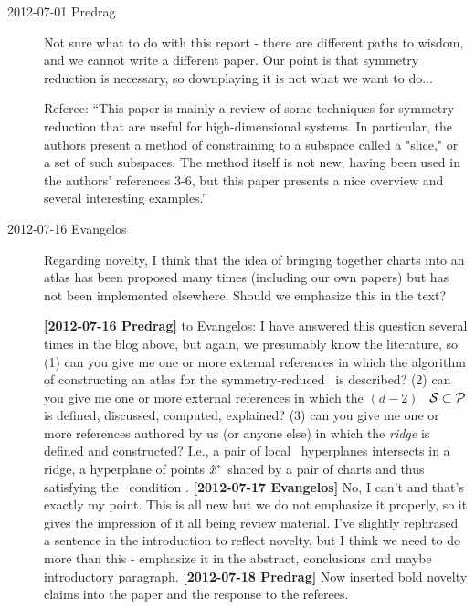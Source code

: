 \begin{description}

\item[2012-07-01 Predrag] Not sure what to do with this report -
there are different paths to wisdom, and we cannot
write a different paper. Our point is that symmetry reduction is
necessary, so downplaying it is not what we want to do...

\bigskip

Referee: ``This paper is mainly a review of some techniques for symmetry reduction
that are useful for high-dimensional systems. In particular, the authors
present a method of constraining to a subspace called a "slice," or a set
of such subspaces. The method itself is not new, having been used in the
authors' references 3-6, but this paper presents a nice overview and
several interesting examples.''

\item[2012-07-16 Evangelos]
	Regarding novelty, I think that the idea of bringing together
	charts into an atlas has been proposed many times (including our
	own papers) but has not been implemented elsewhere. Should we
	emphasize this in the text?

{\bf [2012-07-16 Predrag]} to Evangelos: I have answered this question
several times in the blog above, but again, we presumably know the
literature, so
(1) can you give me one or more external references in which the
algorithm of constructing an atlas for the symmetry-reduced \statesp\ is
described?
(2) can you give me one or more external references in which the
$(d\!-\!2)$\dmn\ \emph{\poincBord} ${\cal S} \subset {\cal P}$ is defined,
discussed, computed, explained?
(3) can you give me one or more references authored by us (or anyone
else) in which the \emph{ridge} is defined and constructed? I.e., a pair
of  local \slice\ hyperplanes intersects in a
{ridge}, a  hyperplane {\PoincS} of points
$\hat{x}^*$ shared by a pair of charts and thus satisfying the \slice\
condition .
{\bf [2012-07-17 Evangelos]} No, I can't and
that's exactly my point. This is all new but we do not emphasize it
properly, so it gives the impression of it all being review material.
I've slightly rephrased a sentence in the introduction to reflect novelty,
but I think we need to do more than this - emphasize it in the abstract,
conclusions and maybe introductory paragraph.
{\bf [2012-07-18 Predrag]} Now inserted bold novelty claims into the paper
and the response to the referees.


\end{description}
